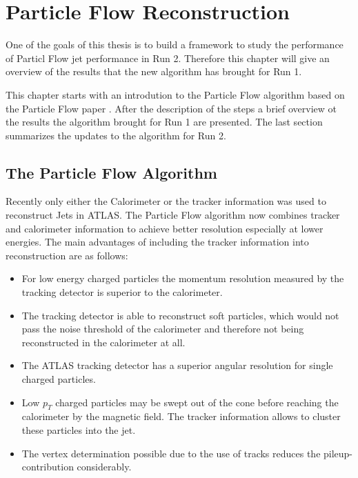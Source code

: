 \chapter{Particle Flow Reconstruction}

One of the goals of this thesis is to build a framework to study the performance of Particl Flow jet performance in Run 2. Therefore this chapter will give an overview of the results that the new algorithm has brought for Run 1.

This chapter starts with an introdution to the Particle Flow algorithm based on the Particle Flow paper \cite{pflow16}. After the description of the steps a brief overview ot the results the algorithm brought for Run 1 are presented. The last section summarizes the updates to the algorithm for Run 2.

\section{The Particle Flow Algorithm}

Recently only either the Calorimeter or the tracker information was used to reconstruct Jets in ATLAS. The Particle Flow algorithm now combines tracker and calorimeter information to achieve better resolution especially at lower energies. The main advantages of including the tracker information into reconstruction are as follows:


\begin{itemize}
\item For low energy charged particles the momentum resolution measured by the tracking detector is superior to the calorimeter.
\item The tracking detector is able to reconstruct soft particles, which would not pass the noise threshold of the calorimeter and therefore not being reconstructed in the calorimeter at all.
\item The ATLAS tracking detector has a superior angular resolution for single charged particles.
\item Low $p_T$ charged particles may be swept out of the cone before reaching the calorimeter by the magnetic field. The tracker information allows to cluster these particles into the jet.
\item The vertex determination possible due to the use of tracks reduces the pileup-contribution considerably.
\end{itemize}


